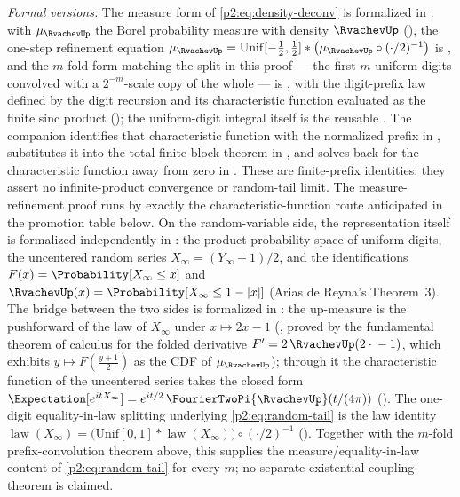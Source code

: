 \documentclass[11pt,oneside]{article}
\numberwithin{equation}{section}
\theoremstyle{definition}
\theoremstyle{remark}
\begin{document}
\emph{Formal versions.}  The measure form of \eqref{p2:eq:density-deconv} is formalized in
: with $\mu_{\RvachevUp}$ the Borel probability measure with density
$\RvachevUp$ (), the one-step refinement equation
$\mu_{\RvachevUp}=\mathrm{Unif}[-\tfrac12,\tfrac12]\ast\bigl(\mu_{\RvachevUp}\circ(\cdot/2)^{-1}\bigr)$ is
, and the $m$-fold form matching the split in this
proof --- the first $m$ uniform digits convolved with a $2^{-m}$-scale copy of the whole ---
is , with the digit-prefix law
 defined by the digit recursion and its characteristic
function evaluated as the finite sinc product
(); the uniform-digit integral itself is the
reusable .
The companion  identifies that characteristic
function with the normalized prefix in
, substitutes
it into the total finite block theorem in
, and solves back
for the characteristic function away from zero in
.  These are
finite-prefix identities; they assert no infinite-product convergence or random-tail
limit.  The measure-refinement proof runs by exactly the
characteristic-function route anticipated in the promotion table below.  On the
random-variable side, the representation itself is formalized independently in
: the product probability space of uniform digits,
the uncentered random series \(X_\infty=(Y_\infty+1)/2\), and the identifications
\(F(x)=\Probability[X_\infty\le x]\) and \(\RvachevUp(x)=\Probability[X_\infty\le1-|x|]\) (Arias de Reyna's
Theorem~3).  The
bridge between the two sides is formalized in : the up-measure
is the pushforward of the law of \(X_\infty\) under \(x\mapsto2x-1\)
(, proved by the fundamental theorem
of calculus for the folded derivative \(F'=2\,\RvachevUp(2\cdot{}-1)\), which exhibits
\(y\mapsto F(\tfrac{y+1}{2})\) as the CDF of \(\mu_{\RvachevUp}\)); through it the characteristic
function of the uncentered series takes the closed form
\(\Expectation[e^{itX_\infty}]=e^{it/2}\,\FourierTwoPi{\RvachevUp}(t/(4\pi))\)
().  The one-digit equality-in-law
splitting underlying \eqref{p2:eq:random-tail} is the law identity
\(\operatorname{law}(X_\infty)
 =\bigl(\mathrm{Unif}[0,1]\ast\operatorname{law}(X_\infty)\bigr)\circ(\cdot/2)^{-1}\)
().  Together with the
\(m\)-fold prefix-convolution theorem above, this supplies the measure/equality-in-law
content of \eqref{p2:eq:random-tail} for every \(m\); no separate existential coupling
theorem is claimed.
\end{document}
